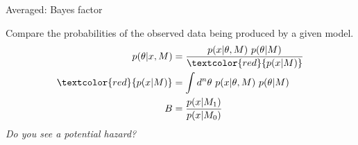 \documentclass[
aspectratio=169,
14pt,
professionalfonts
]{beamer}
\begin{document}
\begin{frame}{Averaged: Bayes factor}
    \vspace{-0.5cm}
        \begin{minipage}{0.74\textwidth}
            Compare the probabilities of the observed data being produced by a given model.
            \begin{align*}
                p(\theta | x, M) &= \frac{p(x | \theta, M) ~ p(\theta | M)}{\textcolor{red}{p(x | M)}}\\
                \textcolor{red}{p(x | M)} &= \int d^n \theta ~ p(x | \theta, M) ~ p(\theta | M)\\
                B &= \frac{p(x | M_1)}{p(x| M_0)}
            \end{align*}
            \textit{Do you see a potential hazard?}
        \end{minipage}
        \begin{minipage}{0.25\textwidth}
            \begin{figure}
                \centering
                \href{https://www.researchgate.net/publication/341958289/figure/fig1/AS:902030868615168@1592072326255/JASP-classification-scheme-for-the-Bayes-factor-BF-10.png}{
}
\end{figure}
\end{minipage}
\end{frame}
\end{document}
